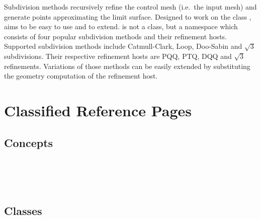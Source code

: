 



Subdivision methods recursively refine the control mesh 
(i.e.~the input mesh) and generate points approximating 
the limit surface. 
Designed to work on the class ,
 aims to be easy to use and to extend.
 is not a class, but a namespace 
which consists of four popular subdivision methods and their refinement
hosts. Supported subdivision methods include Catmull-Clark, Loop, 
Doo-Sabin and $\sqrt{3}$ subdivisions. Their respective refinement 
hosts are PQQ, PTQ, DQQ and $\sqrt{3}$ refinements.
Variations of those methods can be easily 
extended by substituting the geometry computation of the refinement
host.


\section{Classified Reference Pages}

\subsection*{Concepts}
\\
\\
\\

\subsection*{Classes}

\\ 
\\ 
\\ 
\\ 
\\ 

